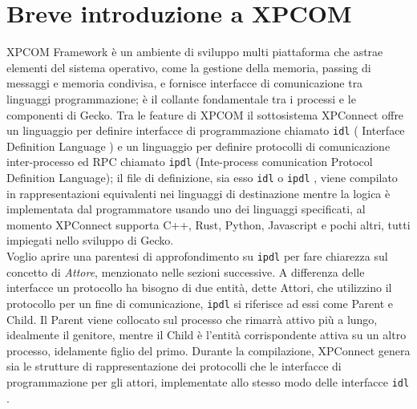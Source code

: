 \documentclass[]{sapthesis}
\newcommand{\code}[1]{\texttt{#1}}
\newcommand{\idl}{\code{idl} }
\newcommand{\ipdl}{\code{ipdl} }
\begin{document}
    \section{Breve introduzione a XPCOM}
        XPCOM Framework è un ambiente di sviluppo multi piattaforma che astrae elementi del sistema operativo,
        come la gestione della memoria, passing di messaggi e memoria condivisa, e fornisce interfacce di 
        comunicazione tra linguaggi programmazione; è il collante fondamentale tra i processi e le componenti di
        Gecko. Tra le feature di XPCOM il sottosistema XPConnect offre un linguaggio per definire
        interfacce di programmazione chiamato \idl ( Interface Definition Language ) e un linguaggio per definire protocolli
        di comunicazione inter-processo ed RPC chiamato \ipdl (Inte-process comunication Protocol Definition Language);
        il file di definizione, sia esso \idl o \ipdl, viene compilato in rappresentazioni equivalenti nei linguaggi
        di destinazione mentre la logica è implementata dal programmatore usando uno dei linguaggi specificati,
        al momento XPConnect supporta C++, Rust, Python, Javascript e pochi altri, tutti impiegati nello sviluppo
        di Gecko.\\
        Voglio aprire una parentesi di approfondimento su \ipdl per fare chiarezza sul concetto di \textit{Attore}, 
        menzionato nelle sezioni successive. A differenza delle interfacce un protocollo ha bisogno di due entità,
        dette Attori, che utilizzino il protocollo per un fine di comunicazione, \ipdl si riferisce ad essi come 
        Parent e Child. Il Parent viene collocato sul processo che rimarrà attivo più a lungo, idealmente il genitore, 
        mentre il Child è l'entità corrispondente attiva su un altro processo, idelamente figlio del primo.
        Durante la compilazione, XPConnect genera sia le strutture di rappresentazione dei protocolli che le
        interfacce di programmazione per gli attori, implementate allo stesso modo delle interfacce \idl.
\end{document}

